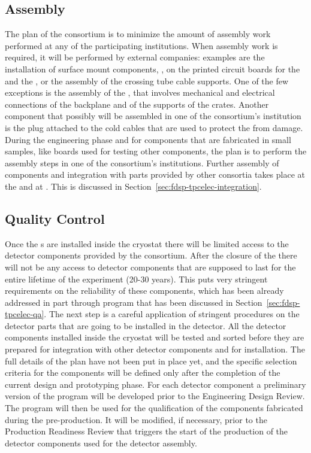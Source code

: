 \subsection{Assembly}
\label{sec:fdsp-tpcelec-production-assembly}

The plan of the  consortium is to minimize
the amount of assembly work performed at any of the participating
institutions. When assembly work is required, it will be performed
by external companies: examples are the installation of surface 
mount components, ,  on the printed 
circuit boards for the  and the , or
the assembly of the crossing tube cable supports. One of the few
exceptions is the assembly of the , that involves
mechanical and electrical connections of the backplane and of
the supports of the crates. Another component that possibly 
will be assembled in one of the consortium's institution is
the plug attached to the cold cables that are used to protect 
the  from  damage. During the engineering
phase and for components that are fabricated in small samples, 
like boards used for testing other components, the plan is to
perform the assembly steps in one of the consortium's institutions.
Further assembly of components and integration with parts
provided by other consortia takes place at the  and
at \surf. This is discussed in 
Section~\ref{sec:fdsp-tpcelec-integration}.

\subsection{Quality Control}
\label{sec:fdsp-tpcelec-production-qc}

Once the s are installed inside the cryostat there will
be limited access to the detector components provided by the 
consortium. After the closure of the  there will not
be any access to detector components that are supposed to
last for the entire lifetime of the experiment (20-30 years). This
puts very stringent requirements on the reliability of these
components, which has been already addressed in part through 
 program that has been discussed in
Section~\ref{sec:fdsp-tpcelec-qa}. The next step is
a careful application of stringent  procedures on the 
detector parts that are going to be installed in the detector.
All the detector components installed inside the cryostat will
be tested and sorted before they are prepared for integration
with other detector components and for installation. The full
details of the  plan have not been put in place
yet, and the specific selection criteria for the components will
be defined only after the completion of the current design and
prototyping phase. For each detector component a preliminary
version of the  program will be developed prior
to the Engineering Design Review. The program will then be used for
the qualification of the components fabricated during the 
pre-production. It will be modified, if necessary, prior to the Production
Readiness Review that triggers the start of the production of the
detector components used for the detector assembly.

